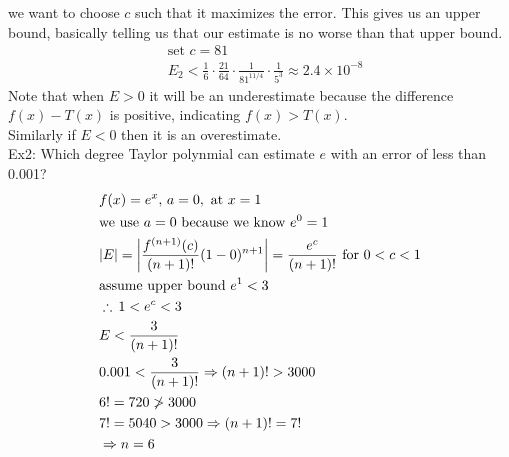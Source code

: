 \documentclass[11pt, fleqn]{article}
\begin{document}
we want to choose $c$ such that it maximizes the error. This gives us an upper bound, basically telling us that our estimate is no worse than that upper bound.
\begin{align*}
    &\text{set }c=81\\
    &E_2<\frac{1}{6}\cdot\frac{21}{64}\cdot\frac{1}{81^{11/4}}\cdot\frac{1}{5^3}\approx2.4\times10^{-8}
\end{align*}
Note that when $E>0$ it will be an underestimate because the difference $f(x)-T(x)$ is positive, indicating $f(x)>T(x)$.\\
Similarly if $E<0$ then it is an overestimate.\\
Ex2: Which degree Taylor polynmial can estimate $e$ with an error of less than 0.001?
\begin{align*}
    &f(x)=e^x,\,a=0,\text{ at $x=1$}\\
    &\text{we use $a=0$ because we know $e^0=1$}\\
    &|E|=\left|\frac{f^{(n+1)}(c)}{(n+1)!}(1-0)^{n+1}\right|=\frac{e^c}{(n+1)!}\text{ for $0<c<1$}\\
    &\text{assume upper bound $e^1<3$}\\
    &\therefore\,1<e^c<3\\
    &E<\frac{3}{(n+1)!}\\
    &0.001<\frac{3}{(n+1)!}\Rightarrow (n+1)!>3000\\
    &6!=720\ngtr 3000\\
    &7!=5040>3000\Rightarrow (n+1)!=7!\\
    &\Rightarrow n=6
\end{align*}
\end{document}
